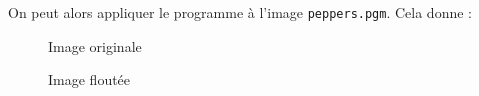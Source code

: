 \documentclass[french,a4paper,10pt]{article}
\begin{document}
    On peut alors appliquer le programme à l'image \texttt{peppers.pgm}.
    Cela donne :
    \begin{figure}[!htb]
        \begin{minipage}{0.48\textwidth}
            \centering
            \caption{Image originale}\label{Fig:peppers-grey-2}
        \end{minipage}\hfill
        \begin{minipage}{0.48\textwidth}
            \centering
            \caption{Image floutée}\label{Fig:peppers-grey-ff2}
        \end{minipage}
    \end{figure}
\end{document}
